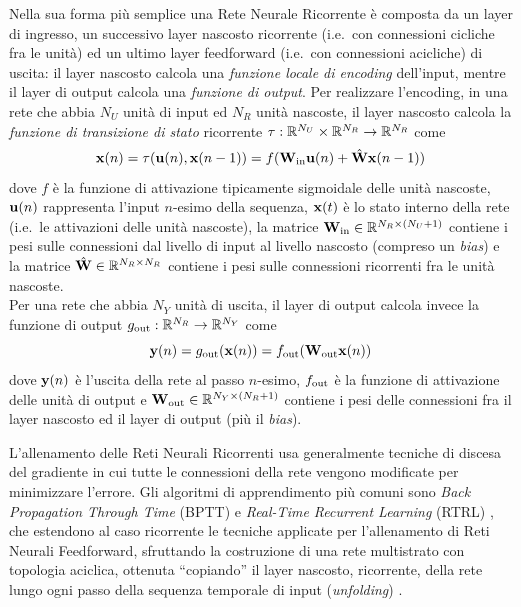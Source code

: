 Nella sua forma più semplice una Rete Neurale Ricorrente è composta da un layer di ingresso, un successivo layer nascosto ricorrente (i.e.\ con connessioni cicliche fra le unità) ed un ultimo layer feedforward (i.e.\ con connessioni acicliche) di uscita: il layer nascosto calcola una \emph{funzione locale di encoding} dell'input, mentre il layer di output calcola una \emph{funzione di output}.
Per realizzare l'encoding, in una rete che abbia $N_U$ unità di input ed $N_R$ unità nascoste, il layer nascosto calcola la \emph{funzione di transizione di stato} ricorrente $\tau : \mathbb{R}^{N_U} \times \mathbb{R}^{N_R} \rightarrow \mathbb{R}^{N_R}$ come
\begin{equation}\label{intro:rnn:encoding}
\vect{x}(n) = \tau(\vect{u}(n), \vect{x}(n-1) ) = f( \matr{W}_\textup{in} \vect{u}(n) + \hat{\matr{W}} \vect{x}(n-1) )
\end{equation}
dove $f$ è la funzione di attivazione tipicamente sigmoidale delle unità nascoste, $\mathbf{u}(n)$ rappresenta l'input $n$-esimo della sequenza, $\mathbf{x}(t)$ è lo stato interno della rete (i.e.\ le attivazioni delle unità nascoste), la matrice $\matr{W}_\textup{in} \in \R^{N_R \times (N_U + 1)}$ contiene i pesi sulle connessioni dal livello di input al livello nascosto (compreso un \emph{bias}) e la matrice $\hat{\matr{W}} \in \R^{N_R \times N_R}$ contiene i pesi sulle connessioni ricorrenti fra le unità nascoste.\\
Per una rete che abbia $N_Y$ unità di uscita, il layer di output calcola invece la funzione di output $g_\textup{out} : \mathbb{R}^{N_R} \rightarrow \mathbb{R}^{N_Y}$ come
\begin{equation}\label{intro:rnn:output}
\vect{y}(n) = g_\textup{out}(\vect{x}(n)) = f_\textup{out}(\matr{W}_\textup{out} \vect{x}(n))
\end{equation}
dove $\mathbf{y}(n)$ è l'uscita della rete al passo $n$-esimo, $f_\textup{out}$ è la funzione di attivazione delle unità di output e $\matr{W}_\textup{out} \in \R^{N_Y \times (N_R + 1)}$ contiene i pesi delle connessioni fra il layer nascosto ed il layer di output (più il \emph{bias}).

L'allenamento delle Reti Neurali Ricorrenti usa generalmente tecniche di discesa del gradiente in cui tutte le connessioni della rete vengono modificate per minimizzare l'errore. Gli algoritmi di apprendimento più comuni sono \emph{Back Propagation Through Time} (BPTT) \cite{Werbos:BPTT} e \emph{Real-Time Recurrent Learning} (RTRL) \cite{Williams:RTRL}, che estendono al caso ricorrente le tecniche applicate per l'allenamento di Reti Neurali Feedforward, sfruttando la costruzione di una rete multistrato con topologia aciclica, ottenuta ``copiando'' il layer nascosto, ricorrente, della rete lungo ogni passo della sequenza temporale di input (\emph{unfolding}) \cite{Rumelhart:LearningInternal}.



